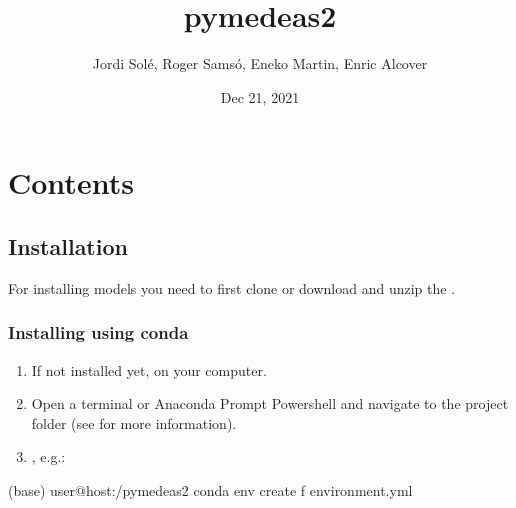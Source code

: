 \documentclass[letterpaper,10pt,english]{sphinxmanual}
\title{pymedeas2}
\date{Dec 21, 2021}
\author{Jordi Solé, Roger Samsó, Eneko Martin, Enric Alcover}
\begin{document}
\pagestyle{empty}
\sphinxmaketitle
\pagestyle{plain}
\sphinxtableofcontents
\pagestyle{normal}
\label{\detokenize{index::doc}}

\chapter{Contents}
\label{\detokenize{index:contents}}

\section{Installation}
\label{\detokenize{installation:installation}}\label{\detokenize{installation::doc}}
\sphinxAtStartPar
For installing  models you need to first clone or download and unzip the .


\subsection{Installing using conda}
\label{\detokenize{installation:installing-using-conda}}\begin{enumerate}
%
\item {} 
\sphinxAtStartPar
If not installed yet,  on your computer.

\item {} 
\sphinxAtStartPar
Open a terminal or Anaconda Prompt Powershell and navigate to the project folder (see {\hyperref[\detokenize{navigating::doc}]{}} for more information).

\item {} 
\sphinxAtStartPar
{}, e.g.:

\end{enumerate}

\begin{sphinxVerbatim}[commandchars=\\\{\}]
(base) user@host:\PYGZti{}/pymedeas2\PYGZdl{} conda env create \PYGZhy{}f environment.yml
\end{sphinxVerbatim}
\end{document}
